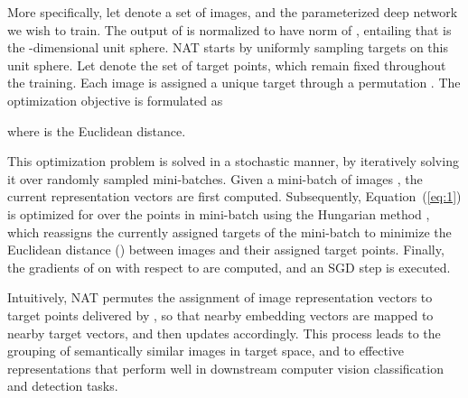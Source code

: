 \documentclass[a4paper,conference]{IEEEtran}
\begin{document}
More specifically, let  denote a set of images, and  the parameterized deep network we wish to train. The output of  is normalized to have  norm of , entailing that  is the -dimensional unit sphere. NAT starts by uniformly sampling  targets on this unit sphere. Let  denote the set of target points, which remain fixed throughout the training. Each image  is assigned a unique target  through a permutation . The optimization objective is formulated as

where  is the Euclidean distance.

This optimization problem is solved in a stochastic manner, by iteratively solving it over randomly sampled mini-batches. Given a mini-batch of images , the current representation vectors  are first computed. Subsequently, Equation~(\ref{eq:1}) is optimized for  over the points in mini-batch  using the Hungarian method \cite{Kuhn55thehungarian}, which reassigns the currently assigned targets of the mini-batch to minimize the Euclidean distance () between images and their assigned target points. Finally, the gradients of  on  with respect to  are computed, and an SGD step is executed.

Intuitively, NAT permutes the assignment of image representation vectors to target points delivered by , so that nearby embedding vectors are mapped to nearby target vectors, and then updates  accordingly. This process leads to the grouping  of semantically similar images in target space, and to effective representations that perform well in downstream computer vision classification and detection tasks.
\end{document}
